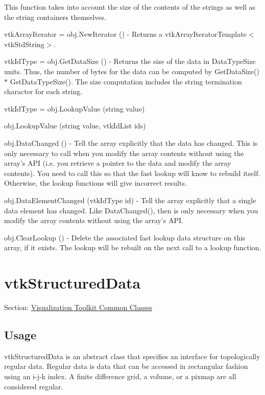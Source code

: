 \begin{DoxyItemize}
This function takes into account the size of the contents of the strings as well as the string containers themselves.  
\item {\ttfamily vtk\-Array\-Iterator = obj.\-New\-Iterator ()} -\/ Returns a vtk\-Array\-Iterator\-Template$<$vtk\-Std\-String$>$.  
\item {\ttfamily vtk\-Id\-Type = obj.\-Get\-Data\-Size ()} -\/ Returns the size of the data in Data\-Type\-Size units. Thus, the number of bytes for the data can be computed by Get\-Data\-Size() $\ast$ Get\-Data\-Type\-Size(). The size computation includes the string termination character for each string.  
\item {\ttfamily vtk\-Id\-Type = obj.\-Lookup\-Value (string value)}  
\item {\ttfamily obj.\-Lookup\-Value (string value, vtk\-Id\-List ids)}  
\item {\ttfamily obj.\-Data\-Changed ()} -\/ Tell the array explicitly that the data has changed. This is only necessary to call when you modify the array contents without using the array's A\-P\-I (i.\-e. you retrieve a pointer to the data and modify the array contents). You need to call this so that the fast lookup will know to rebuild itself. Otherwise, the lookup functions will give incorrect results.  
\item {\ttfamily obj.\-Data\-Element\-Changed (vtk\-Id\-Type id)} -\/ Tell the array explicitly that a single data element has changed. Like Data\-Changed(), then is only necessary when you modify the array contents without using the array's A\-P\-I.  
\item {\ttfamily obj.\-Clear\-Lookup ()} -\/ Delete the associated fast lookup data structure on this array, if it exists. The lookup will be rebuilt on the next call to a lookup function.  
\end{DoxyItemize}\hypertarget{vtkcommon_vtkstructureddata}{}\section{vtk\-Structured\-Data}\label{vtkcommon_vtkstructureddata}
Section\-: \hyperlink{sec_vtkcommon}{Visualization Toolkit Common Classes} \hypertarget{vtkwidgets_vtkxyplotwidget_Usage}{}\subsection{Usage}\label{vtkwidgets_vtkxyplotwidget_Usage}
vtk\-Structured\-Data is an abstract class that specifies an interface for topologically regular data. Regular data is data that can be accessed in rectangular fashion using an i-\/j-\/k index. A finite difference grid, a volume, or a pixmap are all considered regular.

